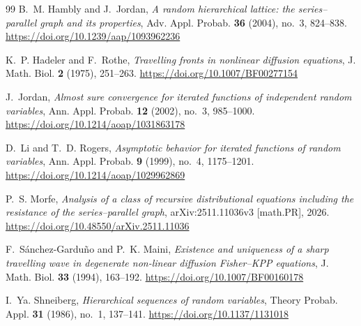 \documentclass[a4paper,fleqn]{cas-sc}
\numberwithin{equation}{section}
\theoremstyle{plain}
\theoremstyle{definition}
\begin{document}
\begin{thebibliography}{99}
B.~M. Hambly and J.~Jordan,
\emph{A random hierarchical lattice: the series--parallel graph and its
properties},
Adv. Appl. Probab. \textbf{36} (2004), no.~3, 824--838.
\url{https://doi.org/10.1239/aap/1093962236}

K.~P. Hadeler and F.~Rothe,
\emph{Travelling fronts in nonlinear diffusion equations},
J. Math. Biol. \textbf{2} (1975), 251--263.
\url{https://doi.org/10.1007/BF00277154}

J.~Jordan,
\emph{Almost sure convergence for iterated functions of independent random
variables},
Ann. Appl. Probab. \textbf{12} (2002), no.~3, 985--1000.
\url{https://doi.org/10.1214/aoap/1031863178}

D.~Li and T.~D. Rogers,
\emph{Asymptotic behavior for iterated functions of random variables},
Ann. Appl. Probab. \textbf{9} (1999), no.~4, 1175--1201.
\url{https://doi.org/10.1214/aoap/1029962869}

P.~S. Morfe,
\emph{Analysis of a class of recursive distributional equations including the
resistance of the series--parallel graph},
arXiv:2511.11036v3 [math.PR], 2026.
\url{https://doi.org/10.48550/arXiv.2511.11036}

F.~S\'anchez-Gardu\~no and P.~K. Maini,
\emph{Existence and uniqueness of a sharp travelling wave in degenerate
non-linear diffusion Fisher--KPP equations},
J. Math. Biol. \textbf{33} (1994), 163--192.
\url{https://doi.org/10.1007/BF00160178}

I.~Ya. Shneiberg,
\emph{Hierarchical sequences of random variables},
Theory Probab. Appl. \textbf{31} (1986), no.~1, 137--141.
\url{https://doi.org/10.1137/1131018}

\end{thebibliography}
\end{document}
